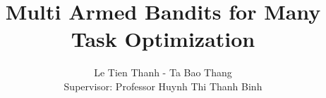 \title{Multi Armed Bandits for Many Task Optimization}
\author{Le Tien Thanh - Ta Bao Thang \\ Supervisor: Professor Huynh Thi Thanh Binh}